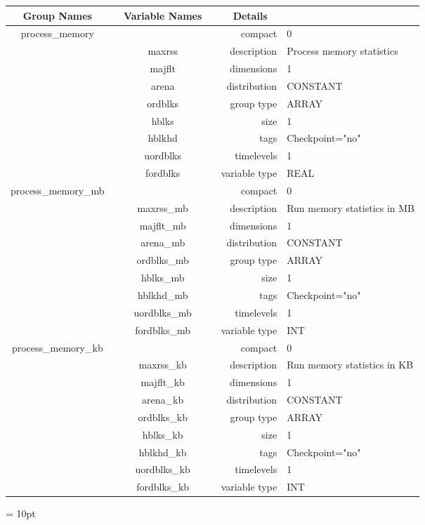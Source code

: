 \begin{tabular*}{150mm}{|c|c@{\extracolsep{\fill}}|rl|} \hline 
~ {\bf Group Names} ~ & ~ {\bf Variable Names} ~  &{\bf Details} ~ & ~\\ 
\hline 
process\_memory &  & compact & 0 \\ 
 & maxrss & description & Process memory statistics \\ 
 & majflt & dimensions & 1 \\ 
 & arena & distribution & CONSTANT \\ 
 & ordblks & group type & ARRAY \\ 
 & hblks & size & 1 \\ 
 & hblkhd & tags & Checkpoint="no" \\ 
 & uordblks & timelevels & 1 \\ 
 & fordblks & variable type & REAL \\ 
\hline 
process\_memory\_mb &  & compact & 0 \\ 
 & maxrss\_mb & description & Run memory statistics in MB \\ 
 & majflt\_mb & dimensions & 1 \\ 
 & arena\_mb & distribution & CONSTANT \\ 
 & ordblks\_mb & group type & ARRAY \\ 
 & hblks\_mb & size & 1 \\ 
 & hblkhd\_mb & tags & Checkpoint="no" \\ 
 & uordblks\_mb & timelevels & 1 \\ 
 & fordblks\_mb & variable type & INT \\ 
\hline 
process\_memory\_kb &  & compact & 0 \\ 
 & maxrss\_kb & description & Run memory statistics in KB \\ 
 & majflt\_kb & dimensions & 1 \\ 
 & arena\_kb & distribution & CONSTANT \\ 
 & ordblks\_kb & group type & ARRAY \\ 
 & hblks\_kb & size & 1 \\ 
 & hblkhd\_kb & tags & Checkpoint="no" \\ 
 & uordblks\_kb & timelevels & 1 \\ 
 & fordblks\_kb & variable type & INT \\ 
\hline 
\end{tabular*} 



\vspace{5mm}\parskip = 10pt 
